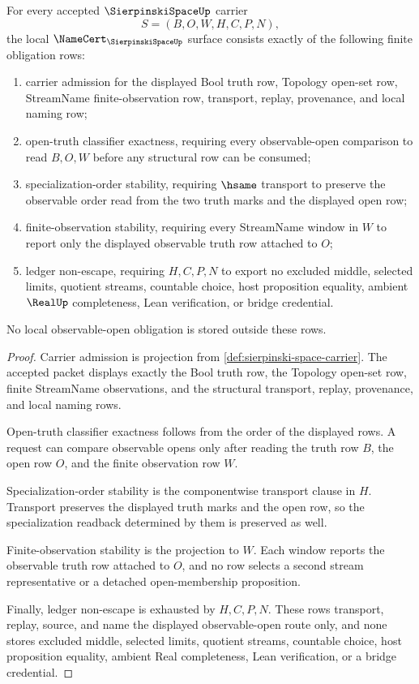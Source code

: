 \begin{theorem}
\label{thm:sierpinski-space-namecert-obligation-surface}
For every accepted $\SierpinskiSpaceUp$ carrier
$$
S=(B,O,W,H,C,P,N),
$$
the local $\NameCert_{\SierpinskiSpaceUp}$ surface consists exactly of the following finite obligation rows:
\begin{enumerate}
\item carrier admission for the displayed Bool truth row, Topology open-set row, StreamName finite-observation row, transport, replay, provenance, and local naming row;
\item open-truth classifier exactness, requiring every observable-open comparison to read $B,O,W$ before any structural row can be consumed;
\item specialization-order stability, requiring $\hsame$ transport to preserve the observable order read from the two truth marks and the displayed open row;
\item finite-observation stability, requiring every StreamName window in $W$ to report only the displayed observable truth row attached to $O$;
\item ledger non-escape, requiring $H,C,P,N$ to export no excluded middle, selected limits, quotient streams, countable choice, host proposition equality, ambient $\RealUp$ completeness, Lean verification, or bridge credential.
\end{enumerate}
No local observable-open obligation is stored outside these rows.
\end{theorem}
\begin{proof}
Carrier admission is projection from \autoref{def:sierpinski-space-carrier}. The accepted packet displays exactly the Bool truth row, the Topology open-set row, finite StreamName observations, and the structural transport, replay, provenance, and local naming rows.

Open-truth classifier exactness follows from the order of the displayed rows. A request can compare observable opens only after reading the truth row $B$, the open row $O$, and the finite observation row $W$.

Specialization-order stability is the componentwise transport clause in $H$. Transport preserves the displayed truth marks and the open row, so the specialization readback determined by them is preserved as well.

Finite-observation stability is the projection to $W$. Each window reports the observable truth row attached to $O$, and no row selects a second stream representative or a detached open-membership proposition.

Finally, ledger non-escape is exhausted by $H,C,P,N$. These rows transport, replay, source, and name the displayed observable-open route only, and none stores excluded middle, selected limits, quotient streams, countable choice, host proposition equality, ambient Real completeness, Lean verification, or a bridge credential.
\end{proof}

